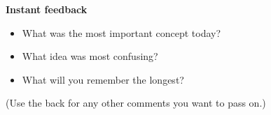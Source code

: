 \documentclass[14pt]{extarticle}
\begin{document}
\centerline{\bf\large Instant feedback}
\begin{itemize}
\item What was the most important concept today?
\vspace{2.25in}
\item What idea was most confusing?
\vspace{2.25in}
\item What will you remember the longest?
\vspace{2.25in}
\end{itemize}
(Use the back for any other comments you want to pass on.)
\end{document}

